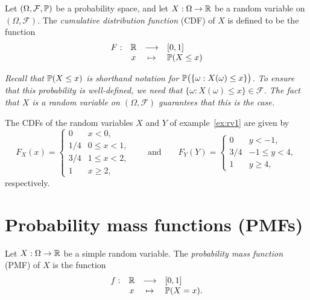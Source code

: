 \begin{definition}
Let $(\Omega,\mathcal{F},\mathbb{P})$ be a probability space, and let $X:\Omega\to\mathbb{R}$ be a random variable on $(\Omega,\mathcal{F})$. The \emph{cumulative distribution function} (CDF) of $X$ is defined to be the function
\[
\begin{array}{cccl}
F:	& \mathbb{R}	& \longrightarrow	& [0,1] \\
	& x 			& \mapsto			& \mathbb{P}(X\leq x) 
\end{array}
\]
\end{definition}

\begin{remark}
\bit
\it Recall that $\mathbb{P}(X\leq x)$ is shorthand notation for $\mathbb{P}\big(\{\omega:X(\omega) \leq x\}\big)$.
\it To ensure that this probability is well-defined, we need that $\{\omega:X(\omega) \leq x\}\in\mathcal{F}$.
\it The fact that $X$ is a random variable on $(\Omega,\mathcal{F})$ guarantees that this is the case.
\eit
\end{remark}

\begin{example}
The CDFs of the random variables $X$ and $Y$ of example~\ref{ex:rv1} are given by
\[
F_X(x) = \begin{cases}
0	& x < 0, \\
1/4	& 0 \leq x < 1, \\
3/4	& 1 \leq x < 2, \\
1	& x \geq 2,
\end{cases}
\qquad\text{and}\qquad
F_Y(Y) = \begin{cases}
0	& y < -1, \\
3/4	& -1 \leq y < 4, \\
1	& y \geq 4,
\end{cases}
\]
respectively.
\end{example}


\section{Probability mass functions (PMFs)}
\begin{definition}\label{def:pmf_of_simple_rv}
Let $X:\Omega\to\mathbb{R}$ be a simple random variable. The \emph{probability mass function} (PMF) of $X$ is the function
\[
\begin{array}{cccl}
f:	& \mathbb{R}	& \longrightarrow	& [0,1] \\
	& x 			& \mapsto			& \mathbb{P}(X = x).
\end{array}
\]
\end{definition}

